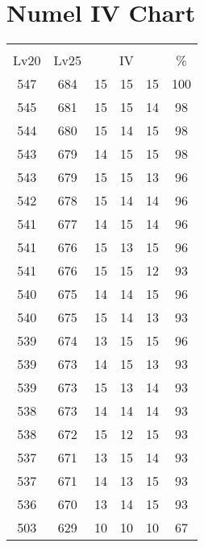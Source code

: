 \documentclass{article}%
\begin{document}
%
\normalsize%
\section{Numel IV Chart}%
\label{sec:Numel IV Chart}%
\renewcommand{\arraystretch}{1.5}%
\begin{tabular}{|c|c|c|c|c|c|}%
\hline%
\multicolumn{6}{|c|}{\textcolor{white}{ 
\linebreak{Numel}
}%
\cellcolor{black}}\\%
\multicolumn{1}{|c}{Lv20}&\multicolumn{1}{c|}{Lv25}&\multicolumn{3}{c|}{IV}&\multicolumn{1}{|c|}{\%}\\%
\hline%
\rowcolor{color100}%
547&684&15&15&15&100\\%
\hline%
\rowcolor{color98}%
545&681&15&15&14&98\\%
\hline%
\rowcolor{color98}%
544&680&15&14&15&98\\%
\hline%
\rowcolor{color98}%
543&679&14&15&15&98\\%
\hline%
\rowcolor{color96}%
543&679&15&15&13&96\\%
\hline%
\rowcolor{color96}%
542&678&15&14&14&96\\%
\hline%
\rowcolor{color96}%
541&677&14&15&14&96\\%
\hline%
\rowcolor{color96}%
541&676&15&13&15&96\\%
\hline%
\rowcolor{color93}%
541&676&15&15&12&93\\%
\hline%
\rowcolor{color96}%
540&675&14&14&15&96\\%
\hline%
\rowcolor{color93}%
540&675&15&14&13&93\\%
\hline%
\rowcolor{color96}%
539&674&13&15&15&96\\%
\hline%
\rowcolor{color93}%
539&673&14&15&13&93\\%
\hline%
\rowcolor{color93}%
539&673&15&13&14&93\\%
\hline%
\rowcolor{color93}%
538&673&14&14&14&93\\%
\hline%
\rowcolor{color93}%
538&672&15&12&15&93\\%
\hline%
\rowcolor{color93}%
537&671&13&15&14&93\\%
\hline%
\rowcolor{color93}%
537&671&14&13&15&93\\%
\hline%
\rowcolor{color93}%
536&670&13&14&15&93\\%
\hline%
\rowcolor{color91}%
503&629&10&10&10&67\\%
\end{tabular}

%
\end{document}
